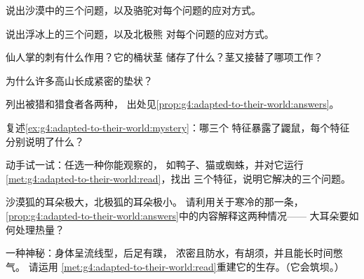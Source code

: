 \begin{exercise}[$\star$]\label{exo:g4:adapted-to-their-world:2}
说出沙漠中的三个问题，以及骆驼对每个问题的应对方式。
\end{exercise}

\begin{exercise}[$\star$]\label{exo:g4:adapted-to-their-world:3}
说出浮冰上的三个问题，以及北极熊
对每个问题的应对方式。
\end{exercise}

\begin{exercise}[$\star$]\label{exo:g4:adapted-to-their-world:4}
仙人掌的刺有什么作用？它的桶状茎
储存了什么？茎又接替了哪项工作？
\end{exercise}

\begin{exercise}[$\star$]\label{exo:g4:adapted-to-their-world:5}
为什么许多高山长成紧密的垫状？
\end{exercise}

\begin{exercise}[$\star$]\label{exo:g4:adapted-to-their-world:6}
列出被猎和猎食者各两种，
出处见\cref{prop:g4:adapted-to-their-world:answers}。
\end{exercise}

\begin{exercise}[$\star$]\label{exo:g4:adapted-to-their-world:7}
复述\cref{ex:g4:adapted-to-their-world:mystery}：哪三个
特征暴露了鼹鼠，每个特征
分别说明了什么？
\end{exercise}

\begin{exercise}[$\star$]\label{exo:g4:adapted-to-their-world:8}
动手试一试：任选一种你能观察的，
如鸭子、猫或蜘蛛，并对它运行
\cref{met:g4:adapted-to-their-world:read}，找出
三个特征，说明它解决的三个问题。
\end{exercise}

\begin{exercise}[$\star\star$]\label{exo:g4:adapted-to-their-world:9}
沙漠狐的耳朵极大，北极狐的耳朵极小。
请利用关于寒冷的那一条，
\cref{prop:g4:adapted-to-their-world:answers}中的内容解释这两种情况——
大耳朵要如何处理热量？
\end{exercise}

\begin{exercise}[$\star\star$]\label{exo:g4:adapted-to-their-world:10}
一种神秘：身体呈流线型，后足有蹼，
浓密且防水，有胡须，并且能长时间憋气。
请运用
\cref{met:g4:adapted-to-their-world:read}重建它的生存。（它会筑坝。）
\end{exercise}

